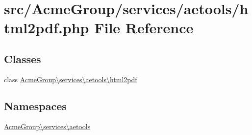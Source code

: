 \hypertarget{html2pdf_8php}{\section{src/\+Acme\+Group/services/aetools/html2pdf.php File Reference}
\label{html2pdf_8php}
}
\subsection*{Classes}
\begin{DoxyCompactItemize}
\item 
class \hyperlink{class_acme_group_1_1services_1_1aetools_1_1html2pdf}{Acme\+Group\textbackslash{}services\textbackslash{}aetools\textbackslash{}html2pdf}
\end{DoxyCompactItemize}
\subsection*{Namespaces}
\begin{DoxyCompactItemize}
\item 
 \hyperlink{namespace_acme_group_1_1services_1_1aetools}{Acme\+Group\textbackslash{}services\textbackslash{}aetools}
\end{DoxyCompactItemize}
